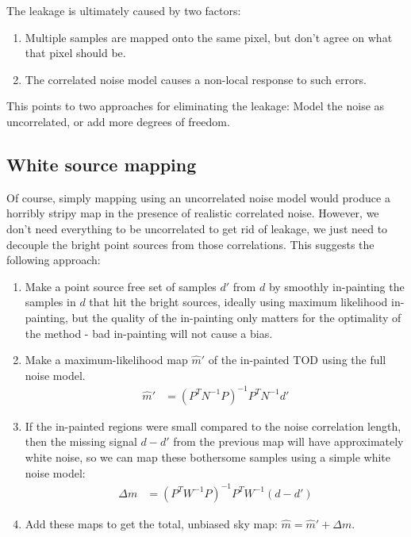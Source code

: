 \documentclass{article}
\begin{document}
The leakage is ultimately caused by two factors:
\begin{enumerate}
	\item Multiple samples are mapped onto the same pixel, but don't agree on what that
		pixel should be.
	\item The correlated noise model causes a non-local response to such errors.
\end{enumerate}
This points to two approaches for eliminating the leakage: Model the noise as
uncorrelated, or add more degrees of freedom.

\subsection{White source mapping}
Of course, simply mapping using an uncorrelated noise model would produce a horribly stripy
map in the presence of
realistic correlated noise. However, we don't need everything to be uncorrelated to get
rid of leakage, we just need to decouple the bright point sources from those correlations.
This suggests the following approach:
\begin{enumerate}
	\item Make a point source free set of samples $d'$ from $d$ by smoothly in-painting the samples in $d$
		that hit the bright sources, ideally using maximum likelihood in-painting, but the quality of the
		in-painting only matters for the optimality of the method - bad in-painting will not cause a bias.
	\item Make a maximum-likelihood map $\hat m'$ of the in-painted TOD using the full noise model.
		\begin{align}
		\hat m' &= (P^TN^{-1}P)^{-1}P^T N^{-1} d'
		\end{align}
	\item If the in-painted regions were small compared to the noise correlation length, then
		the missing signal $d-d'$ from the previous map will have approximately white noise,
		so we can map these bothersome samples using a simple white noise model:
		\begin{align}
		\Delta m &= (P^TW^{-1}P)^{-1}P^T W^{-1}(d-d')
		\end{align}
	\item Add these maps to get the total, unbiased sky map: $\hat m = \hat m' + \Delta m$.
\end{enumerate}
\end{document}
